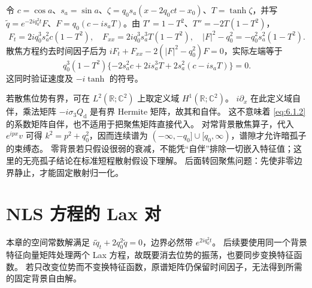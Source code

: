 \documentclass[lang=cn,scheme=chinese,mode=simple,device=normal,color=blue,
math=cm,thmcnt=section,12pt]{elegantbook}
\begin{document}
\begin{callout}[计算：暗孤子代入散焦方程的每个系数]
    令 $c=\cos a$、$s_a=\sin a$、$\zeta=q_0s_a(x-2q_0ct-x_0)$、$T=\tanh\zeta$，并写 $\widetilde q=e^{-2iq_0^2t}F$、$F=q_0(c-is_aT)$。由 $T'=1-T^2$、$T''=-2T(1-T^2)$，
    \[
        F_t=2iq_0^3s_a^2c(1-T^2),\quad
        F_{xx}=2iq_0^3s_a^3T(1-T^2),\quad
        |F|^2-q_0^2=-q_0^2s_a^2(1-T^2).
    \]
    散焦方程约去时间因子后为 $iF_t+F_{xx}-2(|F|^2-q_0^2)F=0$，实际左端等于
    \[
        q_0^3(1-T^2)\{-2s_a^2c+2is_a^3T+2s_a^2(c-is_aT)\}=0.
    \]
    这同时验证速度及 $-i\tanh$ 的符号。
\end{callout}

\begin{callout}[算子层面的限定与本节出口]
    若散焦位势有界，可在 $L^2(\mathbb R;\mathbb C^2)$ 上取定义域 $H^1(\mathbb R;\mathbb C^2)$。
    $i\partial_x$ 在此定义域自伴，乘法矩阵 $-i\sigma_3Q_{\mathrm{d}}$ 是有界 Hermite 矩阵，故其和自伴。
    这不意味着 \eqref{eq:6.1.2} 的系数矩阵自伴，也不适用于把聚焦矩阵直接代入。
    对常背景散焦算子，代入 $e^{ipx}v$ 可得 $k^2=p^2+q_0^2$，因而连续谱为 $(-\infty,-q_0\rbrack\cup\lbrack q_0,\infty)$，谱隙才允许暗孤子的束缚态。
    零背景若只假设很弱的衰减，不能凭“自伴”排除一切嵌入特征值；这里的无亮孤子结论在标准短程散射假设下理解。
    后面转回聚焦问题：先使非零边界静止，才能固定散射归一化。
\end{callout}

\section{NLS 方程的 Lax 对}

本章的空间常数解满足
$i\widetilde q_t+2q_0^2\widetilde q=0$，边界必然带 $e^{2iq_0^2t}$。
后续要使用同一个背景特征向量矩阵处理两个 Lax 方程，故既要消去位势的振荡，也要同步变换特征函数。
若只改变位势而不变换特征函数，原谱矩阵仍保留时间因子，无法得到所需的固定背景自由解。
\end{document}
